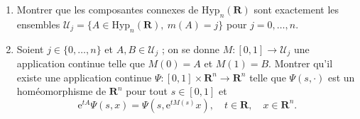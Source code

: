 \documentclass[a4paper,12pt]{article}
\theoremstyle{plain}
\theoremstyle{definition}
\newcommand{\e}{\mathrm{e}}
\newcommand{\R}{\mathbf{R}}
\begin{document}
\begin{enumerate}[resume, label=\textbf{\arabic*.}]
\item Montrer que les composantes connexes de $\mathrm{Hyp}_n(\R)$ sont exactement les ensembles $\mathcal{U}_j = \{A \in \mathrm{Hyp}_n(\R),~m(A) = j\}$ pour $j=0, \dots, n$.

\item Soient $j \in \{0, \dots, n\}$ et $A,B \in \mathcal{U}_j$ ; on se donne $M : [0,1] \to \mathcal{U}_j$ une application continue telle que $M(0) = A$ et $M(1) = B$. Montrer qu'il existe une application continue $\Psi : [0,1] \times \R^n \to \R^n$ telle que $\Psi(s, \cdot)$ est un hom\'eomorphisme de $\R^n$ pour tout $s \in [0,1]$ et 
$$
\e^{tA} \Psi(s, x) = \Psi(s, \e^{tM(s)}x), \quad t \in \R, \quad x \in \R^n.
$$

\end{enumerate}
\end{document}
